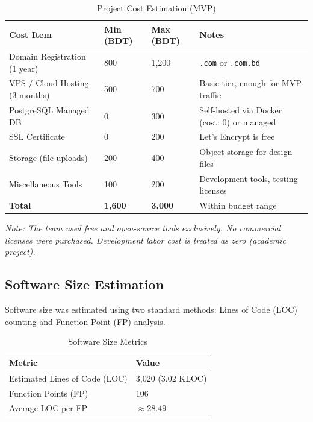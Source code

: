 \documentclass[12pt,a4paper]{report}
\begin{document}
\begin{table}[H]
  \centering
  \caption{Project Cost Estimation (MVP)}
  \begin{tabularx}{\textwidth}{L{5cm} R{2.5cm} R{2.5cm} X}
    \toprule
    \textbf{Cost Item} & \textbf{Min (BDT)} & \textbf{Max (BDT)} & \textbf{Notes} \\
    \midrule
    Domain Registration (1 year) & 800  & 1,200  & \texttt{.com} or \texttt{.com.bd} \\
    VPS / Cloud Hosting (3 months)& 500  & 700    & Basic tier, enough for MVP traffic \\
    PostgreSQL Managed DB         & 0    & 300    & Self-hosted via Docker (cost: 0) or managed \\
    SSL Certificate               & 0    & 200    & Let's Encrypt is free \\
    Storage (file uploads)        & 200  & 400    & Object storage for design files \\
    Miscellaneous Tools           & 100  & 200    & Development tools, testing licenses \\
    \midrule
    \textbf{Total}                & \textbf{1,600} & \textbf{3,000} & Within budget range \\
    \bottomrule
  \end{tabularx}
\end{table}

\textit{Note: The team used free and open-source tools exclusively. No commercial licenses were purchased. Development labor cost is treated as zero (academic project).}

\subsection{Software Size Estimation}

Software size was estimated using two standard methods: Lines of Code (LOC) counting and Function Point (FP) analysis.

\begin{table}[H]
  \centering
  \caption{Software Size Metrics}
  \begin{tabular}{ll}
    \toprule
    \textbf{Metric} & \textbf{Value} \\
    \midrule
    Estimated Lines of Code (LOC) & 3,020 (3.02 KLOC) \\
    Function Points (FP)          & 106 \\
    Average LOC per FP            & $\approx 28.49$ \\
    \bottomrule
  \end{tabular}
\end{table}
\end{document}
